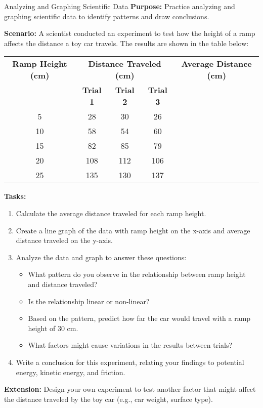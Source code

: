 \begin{investigation}{Analyzing and Graphing Scientific Data}
\textbf{Purpose:} Practice analyzing and graphing scientific data to identify patterns and draw conclusions.

\textbf{Scenario:} A scientist conducted an experiment to test how the height of a ramp affects the distance a toy car travels. The results are shown in the table below:

\begin{center}
\begin{tabular}{|c|c|c|c|c|}
\hline
\textbf{Ramp Height (cm)} & \multicolumn{3}{c|}{\textbf{Distance Traveled (cm)}} & \textbf{Average Distance (cm)} \\
\cline{2-4}
 & \textbf{Trial 1} & \textbf{Trial 2} & \textbf{Trial 3} & \\
\hline
5 & 28 & 30 & 26 & \\
\hline
10 & 58 & 54 & 60 & \\
\hline
15 & 82 & 85 & 79 & \\
\hline
20 & 108 & 112 & 106 & \\
\hline
25 & 135 & 130 & 137 & \\
\hline
\end{tabular}
\end{center}

\textbf{Tasks:}
\begin{enumerate}
    \item Calculate the average distance traveled for each ramp height.
    
    \item Create a line graph of the data with ramp height on the x-axis and average distance traveled on the y-axis.
    
    \item Analyze the data and graph to answer these questions:
    \begin{itemize}
        \item What pattern do you observe in the relationship between ramp height and distance traveled?
        \item Is the relationship linear or non-linear?
        \item Based on the pattern, predict how far the car would travel with a ramp height of 30 cm.
        \item What factors might cause variations in the results between trials?
    \end{itemize}
    
    \item Write a conclusion for this experiment, relating your findings to potential energy, kinetic energy, and friction.
\end{enumerate}

\textbf{Extension:} Design your own experiment to test another factor that might affect the distance traveled by the toy car (e.g., car weight, surface type).
\end{investigation}

